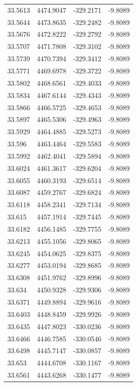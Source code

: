 \begin{table}[H]
\begin{tabular}{llll}
33.5613 & 4474.9047 & -329.2171 & -9.8089 \\
33.5644 & 4473.8635 & -329.2482 & -9.8089 \\
33.5676 & 4472.8222 & -329.2792 & -9.8089 \\
33.5707 & 4471.7808 & -329.3102 & -9.8089 \\
33.5739 & 4470.7394 & -329.3412 & -9.8089 \\
33.5771 & 4469.6978 & -329.3722 & -9.8089 \\
33.5802 & 4468.6561 & -329.4033 & -9.8089 \\
33.5834 & 4467.6144 & -329.4343 & -9.8089 \\
33.5866 & 4466.5725 & -329.4653 & -9.8089 \\
33.5897 & 4465.5306 & -329.4963 & -9.8089 \\
33.5929 & 4464.4885 & -329.5273 & -9.8089 \\
33.596 & 4463.4464 & -329.5583 & -9.8089 \\
33.5992 & 4462.4041 & -329.5894 & -9.8089 \\
33.6024 & 4461.3617 & -329.6204 & -9.8089 \\
33.6055 & 4460.3193 & -329.6514 & -9.8089 \\
33.6087 & 4459.2767 & -329.6824 & -9.8089 \\
33.6118 & 4458.2341 & -329.7134 & -9.8089 \\
33.615 & 4457.1914 & -329.7445 & -9.8089 \\
33.6182 & 4456.1485 & -329.7755 & -9.8089 \\
33.6213 & 4455.1056 & -329.8065 & -9.8089 \\
33.6245 & 4454.0625 & -329.8375 & -9.8089 \\
33.6277 & 4453.0194 & -329.8685 & -9.8089 \\
33.6308 & 4451.9762 & -329.8996 & -9.8089 \\
33.634 & 4450.9328 & -329.9306 & -9.8089 \\
33.6371 & 4449.8894 & -329.9616 & -9.8089 \\
33.6403 & 4448.8459 & -329.9926 & -9.8089 \\
33.6435 & 4447.8023 & -330.0236 & -9.8089 \\
33.6466 & 4446.7585 & -330.0546 & -9.8089 \\
33.6498 & 4445.7147 & -330.0857 & -9.8089 \\
33.653 & 4444.6708 & -330.1167 & -9.8089 \\
33.6561 & 4443.6268 & -330.1477 & -9.8089 \\

\end{tabular}
\end{table}
